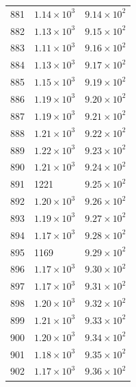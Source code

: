 \begin{table}[H]
\begin{tabular}{lll}
881 & $\displaystyle 1.14 \times 10^{3}$ & $\displaystyle 9.14 \times 10^{2}$ \\
882 & $\displaystyle 1.13 \times 10^{3}$ & $\displaystyle 9.15 \times 10^{2}$ \\
883 & $\displaystyle 1.11 \times 10^{3}$ & $\displaystyle 9.16 \times 10^{2}$ \\
884 & $\displaystyle 1.13 \times 10^{3}$ & $\displaystyle 9.17 \times 10^{2}$ \\
885 & $\displaystyle 1.15 \times 10^{3}$ & $\displaystyle 9.19 \times 10^{2}$ \\
886 & $\displaystyle 1.19 \times 10^{3}$ & $\displaystyle 9.20 \times 10^{2}$ \\
887 & $\displaystyle 1.19 \times 10^{3}$ & $\displaystyle 9.21 \times 10^{2}$ \\
888 & $\displaystyle 1.21 \times 10^{3}$ & $\displaystyle 9.22 \times 10^{2}$ \\
889 & $\displaystyle 1.22 \times 10^{3}$ & $\displaystyle 9.23 \times 10^{2}$ \\
890 & $\displaystyle 1.21 \times 10^{3}$ & $\displaystyle 9.24 \times 10^{2}$ \\
891 & 1221 & $\displaystyle 9.25 \times 10^{2}$ \\
892 & $\displaystyle 1.20 \times 10^{3}$ & $\displaystyle 9.26 \times 10^{2}$ \\
893 & $\displaystyle 1.19 \times 10^{3}$ & $\displaystyle 9.27 \times 10^{2}$ \\
894 & $\displaystyle 1.17 \times 10^{3}$ & $\displaystyle 9.28 \times 10^{2}$ \\
895 & 1169 & $\displaystyle 9.29 \times 10^{2}$ \\
896 & $\displaystyle 1.17 \times 10^{3}$ & $\displaystyle 9.30 \times 10^{2}$ \\
897 & $\displaystyle 1.17 \times 10^{3}$ & $\displaystyle 9.31 \times 10^{2}$ \\
898 & $\displaystyle 1.20 \times 10^{3}$ & $\displaystyle 9.32 \times 10^{2}$ \\
899 & $\displaystyle 1.21 \times 10^{3}$ & $\displaystyle 9.33 \times 10^{2}$ \\
900 & $\displaystyle 1.20 \times 10^{3}$ & $\displaystyle 9.34 \times 10^{2}$ \\
901 & $\displaystyle 1.18 \times 10^{3}$ & $\displaystyle 9.35 \times 10^{2}$ \\
902 & $\displaystyle 1.17 \times 10^{3}$ & $\displaystyle 9.36 \times 10^{2}$ \\

\end{tabular}
\end{table}
